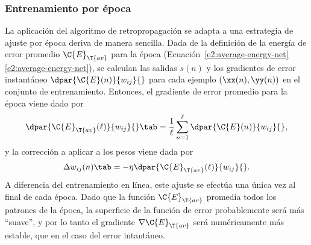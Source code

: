 %
\subsubsection{Entrenamiento por época}
%
La aplicación del algoritmo de retropropagación se adapta a una
estrategia de ajuste por época deriva de manera sencilla. Dada de la
definición de la energía de error promedio $\C{E}_{\T{av}}$ para la
época (\iflatexml{}Ecuación~\ref{e2:average-energy-net}\else\autoref{e2:average-energy-net}\fi),
se calculan las salidas $s(n)$ y los gradientes de error instantáneo
$\dpar{\C{E}(n)}{w_{ij}}{}$ para cada ejemplo $(\xx(n),\yy(n))$ en el
conjunto de entrenamiento. Entonces, el gradiente de error promedio
para la época viene dado por
%
\begin{align}\label{e2:deriv-Eav-wrt-w}
  \dpar{\C{E}_{\T{av}}(\ell)}{w_{ij}}{}\tab=
  \frac{1}{\ell}\sum_{n=1}^\ell\dpar{\C{E}(n)}{w_{ij}}{},
\end{align}
%
y la corrección a aplicar a los pesos viene dada por
%
\begin{align}\label{e2:delta-rule-epoch}
  \Delta w_{ij}(n)\tab=-\eta\dpar{\C{E}_{\T{av}}(\ell)}{w_{ij}}{}.
\end{align}
%
A diferencia del entrenamiento en línea, este ajuste se efectúa una
única vez al final de cada época. Dado que la función $\C{E}_{\T{av}}$
promedia todos los patrones de la época, la superficie de la función
de error probablemente será más ``suave'', y por lo tanto el gradiente
$\nabla\C{E}_{\T{av}}$ será numéricamente más estable, que en el caso
del error intantáneo.
